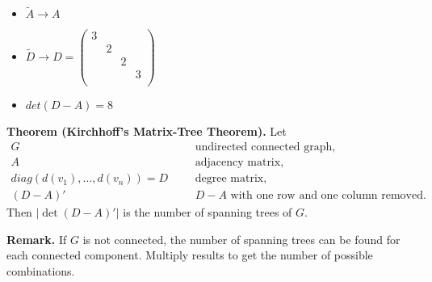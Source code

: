 \begin{itemize}
	\item $\tilde A \rightarrow A$
	\item $\tilde D \rightarrow D = 
		\begin{pmatrix}3 \\ & 2 \\ & & 2 \\ & & & 3 \\ \end{pmatrix}$
	\item $det(D-A) = 8$
\end{itemize}

\textbf{Theorem (Kirchhoff's Matrix-Tree Theorem).}
Let
\begin{align*}
G &&& \text{undirected connected graph,} \\
A &&& \text{adjacency matrix,} \\
diag(d(v_1),\ldots,d(v_n)) = D &&& \text{degree matrix,} \\
(D-A)' &&& \text{$D-A$ with one row and one column removed.}
\end{align*}
Then $|\det{(D-A)'}|$ is the number of spanning trees of $G$.

\textbf{Remark.} If $G$ is not connected, the number of spanning trees can be
found for each connected component. Multiply results to get the number
of possible combinations.





